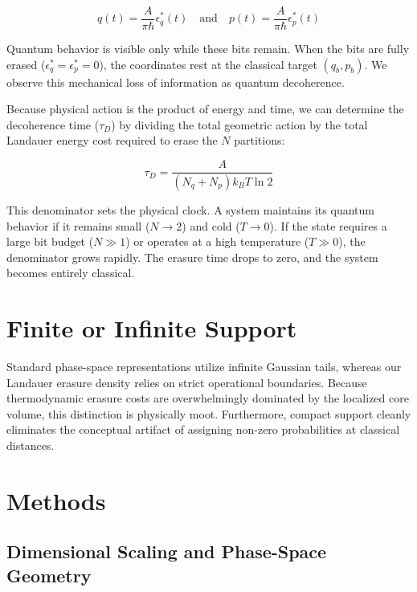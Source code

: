 \documentclass[%
  aps, reprint, prl, amsmath,amssymb
]{revtex4-2}
\begin{document}
\begin{equation}
\label{eq:TimeEvolutionCoordinates}
q(t) = \frac{A}{\pi \hbar} \epsilon_q^*(t) \quad \text{and} \quad p(t) = \frac{A}{\pi \hbar} \epsilon_p^*(t)
\end{equation}

Quantum behavior is visible only while these bits remain. When the bits are fully erased ($\epsilon_q^* = \epsilon_p^* = 0$), the coordinates rest at the classical target $(q_b, p_b)$. We observe this mechanical loss of information as quantum decoherence.

Because physical action is the product of energy and time, we can determine the decoherence time ($\tau_D$) by dividing the total geometric action by the total Landauer energy cost required to erase the $N$ partitions:

\begin{equation}
\label{eq:DecoherenceTime}
\tau_D = \frac{A}{(N_q + N_p) k_B T \ln 2}
\end{equation}

This denominator sets the physical clock. A system maintains its quantum behavior if it remains small ($N \to 2$) and cold ($T \to 0$). If the state requires a large bit budget ($N \gg 1$) or operates at a high temperature ($T \gg 0$), the denominator grows rapidly. The erasure time drops to zero, and the system becomes entirely classical.

\section{Finite or Infinite Support}

Standard phase-space representations utilize infinite Gaussian tails, whereas our Landauer erasure density relies on strict operational boundaries. Because thermodynamic erasure costs are overwhelmingly dominated by the localized core volume, this distinction is physically moot. Furthermore, compact support cleanly eliminates the conceptual artifact of assigning non-zero probabilities at classical distances.

\section{Methods}

\subsection{Dimensional Scaling and Phase-Space Geometry}
\end{document}
